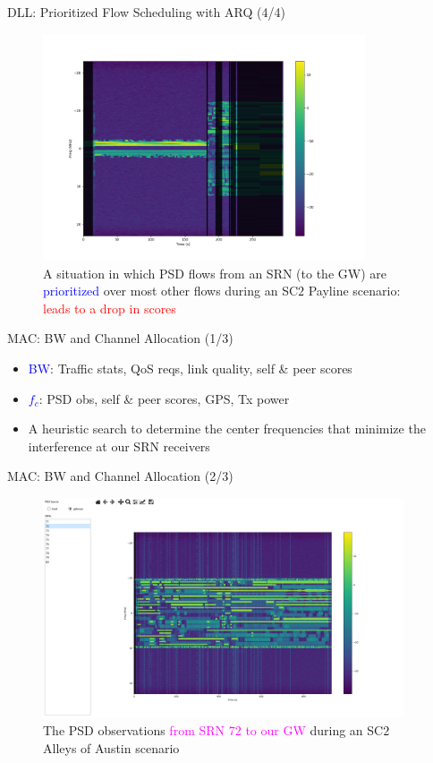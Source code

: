 \documentclass{beamer}
\begin{document}
\begin{frame}{DLL: Prioritized Flow Scheduling with ARQ (4/4)}
\begin{figure}
    \centering
    \includegraphics[width = 0.85\textwidth]{PSD_with_fix_payline.png}
    \caption{A situation in which PSD flows from an SRN (to the GW) are \textcolor{blue}{prioritized} over most other flows during an SC$2$ Payline scenario: \textcolor{red}{leads to a drop in scores}}
    \label{fig:13}
\end{figure}
\end{frame}
\begin{frame}{MAC: BW and Channel Allocation (1/3)}
\begin{itemize}
        \item \textcolor{blue}{BW}: Traffic stats, QoS reqs, link quality, self \& peer scores
        \item \textcolor{blue}{$f_{c}$}: PSD obs, self \& peer scores, GPS, Tx power
        \item A heuristic search to determine the center frequencies that minimize the interference at our SRN receivers
\end{itemize}
\end{frame}
\begin{frame}{MAC: BW and Channel Allocation (2/3)}
\begin{figure}
    \centering
    \includegraphics[width = 0.95\textwidth]{Alleys_PSD.PNG}
    \caption{The PSD observations \textcolor{magenta}{from SRN $72$ to our GW} during an SC$2$ Alleys of Austin scenario}
    \label{fig:15}
\end{figure}
\end{frame}
\end{document}
